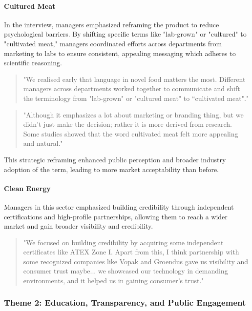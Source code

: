 \paragraph{Cultured Meat}
In the interview, managers emphasized reframing the product to reduce psychological barriers. By shifting specific terms like "lab-grown" or "cultured" to "cultivated meat," managers coordinated efforts across departments from marketing to labs to ensure consistent, appealing messaging which adheres to scientific reasoning.
\begin{quote}
	"We realised early that language in novel food matters the most. Different managers across departments worked together to communicate and shift the terminology from "lab-grown" or "cultured meat" to “cultivated meat"."
\end{quote}
\begin{quote}
	"Although it emphasizes a lot about marketing or branding thing, but we didn't just make the decision; rather it is more derived from research. Some studies showed that the word cultivated meat felt more appealing and natural."
\end{quote}
This strategic reframing enhanced public perception and broader industry adoption of the term, leading to more market acceptability than before.

\paragraph{Clean Energy}
Managers in this sector emphasized building credibility through independent certifications and high-profile partnerships, allowing them to reach a wider market and gain broader visibility and credibility.
\begin{quote}
	"We focused on building credibility by acquiring some independent certificates like ATEX Zone I. Apart from this, I think partnership with some recognized companies like Vopak and Groendus gave us visibility and consumer trust maybe... we showcased our technology in demanding environments, and it helped us in gaining consumer's trust."
\end{quote}

\subsubsection{Theme 2: Education, Transparency, and Public Engagement}

